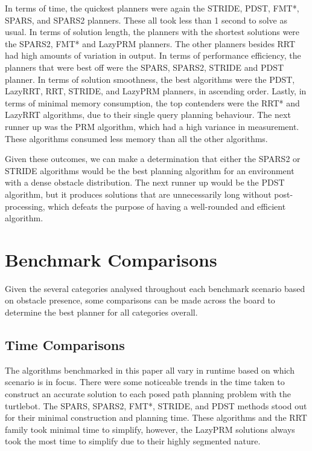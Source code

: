 \documentclass[conference]{IEEEtran} \usepackage[T1]{fontenc} \usepackage[backend=biber, style=ieee]{biblatex}
\begin{document}
In terms of time, the quickest planners were again the STRIDE, PDST, FMT*, SPARS, and SPARS2 planners. These all took less than 1 second to solve as usual.
In terms of solution length, the planners with the shortest solutions were the SPARS2, FMT* and LazyPRM planners. The other planners besides RRT had high amounts of variation in 
output. In terms of performance efficiency, the planners that were best off were the SPARS, SPARS2, STRIDE and PDST planner. In terms of solution smoothness, the best algorithms
were the PDST, LazyRRT, RRT, STRIDE, and LazyPRM planners, in ascending order. Lastly, in terms of minimal memory consumption, the top 
contenders were the RRT* and LazyRRT algorithms, due to their single query planning behaviour. The next runner up was the PRM algorithm, which had a high variance in measurement. 
These algorithms consumed less memory than all the other algorithms.

Given these outcomes, we can make a determination that either the SPARS2 or STRIDE algorithms would be the best planning algorithm for an environment with a dense obstacle 
distribution. The next runner up would be the PDST algorithm, but it produces solutions that are unnecessarily long without post-processing, which defeats the purpose of
having a well-rounded and efficient algorithm. 

\section{Benchmark Comparisons} \label{Benchmark Comparisons}
Given the several categories analysed throughout each benchmark scenario based on obstacle presence, some comparisons can be made across the board to determine the best planner
for all categories overall.

\subsection{Time Comparisons} \label{Time Comparisons}
The algorithms benchmarked in this paper all vary in runtime based on which scenario is in focus. There were some noticeable trends in the time taken to construct an accurate
solution to each posed path planning problem with the turtlebot. The SPARS, SPARS2, FMT*, STRIDE, and PDST methods stood out for their minimal construction and planning time.
These algorithms and the RRT family took minimal time to simplify, however, the LazyPRM solutions always took the most time to simplify due to their highly segmented nature.
\end{document}
